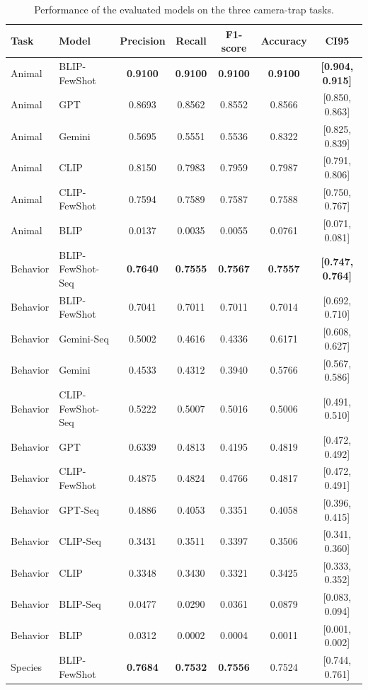 \begin{table}[htbp]
\centering
\caption{Performance of the evaluated models on the three camera-trap tasks.}
\label{tab:overall_results}
\begin{tabular}{llccccc}
\hline
Task & Model & Precision & Recall & F1-score & Accuracy & CI95 \\
\hline
Animal & BLIP-FewShot & \textbf{0.9100} & \textbf{0.9100} & \textbf{0.9100} & \textbf{0.9100} & \textbf{[0.904, 0.915]} \\
Animal & GPT & 0.8693 & 0.8562 & 0.8552 & 0.8566 & [0.850, 0.863] \\ 
Animal & Gemini & 0.5695 & 0.5551 & 0.5536 & 0.8322 & [0.825, 0.839] \\
Animal & CLIP & 0.8150 & 0.7983 & 0.7959 & 0.7987 & [0.791, 0.806] \\
Animal & CLIP-FewShot & 0.7594 & 0.7589 & 0.7587 & 0.7588 & [0.750, 0.767] \\
Animal & BLIP & 0.0137 & 0.0035 & 0.0055 & 0.0761 & [0.071, 0.081] \\
\hline
Behavior & BLIP-FewShot-Seq & \textbf{0.7640} & \textbf{0.7555} & \textbf{0.7567} & \textbf{0.7557} & \textbf{[0.747, 0.764]} \\
Behavior & BLIP-FewShot & 0.7041 & 0.7011 & 0.7011 & 0.7014 & [0.692, 0.710] \\
Behavior & Gemini-Seq & 0.5002 & 0.4616 & 0.4336 & 0.6171 & [0.608, 0.627] \\
Behavior & Gemini & 0.4533 & 0.4312 & 0.3940 & 0.5766 & [0.567, 0.586] \\
Behavior & CLIP-FewShot-Seq & 0.5222 & 0.5007 & 0.5016 & 0.5006 & [0.491, 0.510] \\
Behavior & GPT & 0.6339 & 0.4813 & 0.4195 & 0.4819 & [0.472, 0.492] \\
Behavior & CLIP-FewShot & 0.4875 & 0.4824 & 0.4766 & 0.4817 & [0.472, 0.491] \\
Behavior & GPT-Seq & 0.4886 & 0.4053 & 0.3351 & 0.4058 & [0.396, 0.415] \\
Behavior & CLIP-Seq & 0.3431 & 0.3511 & 0.3397 & 0.3506 & [0.341, 0.360] \\
Behavior & CLIP & 0.3348 & 0.3430 & 0.3321 & 0.3425 & [0.333, 0.352] \\
Behavior & BLIP-Seq & 0.0477 & 0.0290 & 0.0361 & 0.0879 & [0.083, 0.094] \\
Behavior & BLIP & 0.0312 & 0.0002 & 0.0004 & 0.0011 & [0.001, 0.002] \\
\hline
Species & BLIP-FewShot & \textbf{0.7684} & \textbf{0.7532} & \textbf{0.7556} & 0.7524 & [0.744, 0.761] \\

\end{tabular}
\end{table}
